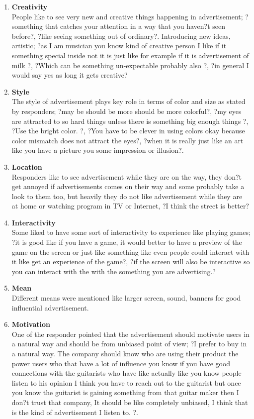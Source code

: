 \begin{enumerate}
		
\item \textbf{Creativity} \\	
People like to see very new and creative things happening in advertisement; ?something that catches your attention in a way that you haven?t seen before?, ?like seeing something out of ordinary?. Introducing new ideas, artistic; ?as I am musician you know kind of creative person I like if it something special inside not it is just like for example if it is advertisement of milk ?, ?Which can be something un-expectable probably also ?, ?in general I would say yes as long it gets creative?


\item \textbf{Style} \\	
The style of advertisement plays key role in terms of color and size as stated by responders; ?may be should be more should be more colorful?, ?my eyes are attracted to so hard things unless there is something big enough things ?, ?Use the bright color. ?, ?You have to be clever in using colors okay because color mismatch does not attract the eyes?, ?when it is really just like an art like you have a picture you some impression or illusion?.

\item \textbf{Location} \\	
Responders like to see advertisement while they are on the way, they don?t get annoyed if advertisements comes on their way and some probably take a look to them too, but heavily they do not like advertisement while they are at home or watching program in TV or Internet, ?I think the street is better?

\item \textbf{Interactivity} \\	
Some liked to have some sort of interactivity to experience like playing games; ?it is good like if you have a game, it would better to have a preview of the game on the screen or just like something like even people could interact with it like get an experience of the game?, ?if the screen will also be interactive so you can interact with the with the something you are advertising.?

\item \textbf{Mean} \\
Different means were mentioned like larger screen, sound, banners for good influential advertisement.

\item \textbf{Motivation} \\
One of the responder pointed that the advertisement should motivate users in a natural way and should be from unbiased point of view; ?I prefer to buy in a natural way. The company should know who are using their product the power users who that have a lot of influence you know if you have good connections with the guitarists who have like actually like you know people listen to his opinion I think you have to reach out to the guitarist but once you know the guitarist is gaining something from that guitar maker then I don?t trust that company, It should be like completely unbiased, I think that is the kind of advertisement I listen to. ?. \\


\end{enumerate}
